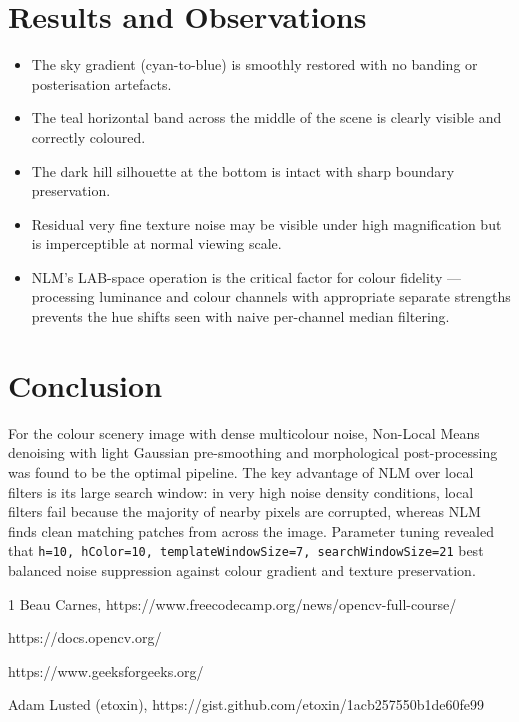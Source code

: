 \documentclass[journal]{IEEEtran}
\begin{document}
\section{Results and Observations}
\begin{itemize}
    \item The sky gradient (cyan-to-blue) is smoothly restored with no banding 
    or posterisation artefacts.
    \item The teal horizontal band across the middle of the scene is clearly 
    visible and correctly coloured.
    \item The dark hill silhouette at the bottom is intact with sharp boundary 
    preservation.
    \item Residual very fine texture noise may be visible under high magnification 
    but is imperceptible at normal viewing scale.
    \item NLM's LAB-space operation is the critical factor for colour fidelity — 
    processing luminance and colour channels with appropriate separate strengths 
    prevents the hue shifts seen with naive per-channel median filtering.
\end{itemize}



\section{Conclusion}
For the colour scenery image with dense multicolour noise, Non-Local Means 
denoising with light Gaussian pre-smoothing and morphological post-processing 
was found to be the optimal pipeline. The key advantage of NLM over local 
filters is its large search window: in very high noise density conditions, 
local filters fail because the majority of nearby pixels are corrupted, 
whereas NLM finds clean matching patches from across the image. Parameter 
tuning revealed that \texttt{h=10, hColor=10, templateWindowSize=7, searchWindowSize=21} 
best balanced noise suppression against colour gradient and texture preservation.

\begin{thebibliography}{1}
Beau Carnes, https://www.freecodecamp.org/news/opencv-full-course/

https://docs.opencv.org/

https://www.geeksforgeeks.org/

Adam Lusted (etoxin), https://gist.github.com/etoxin/1acb257550b1de60fe99

\end{thebibliography}
\end{document}
